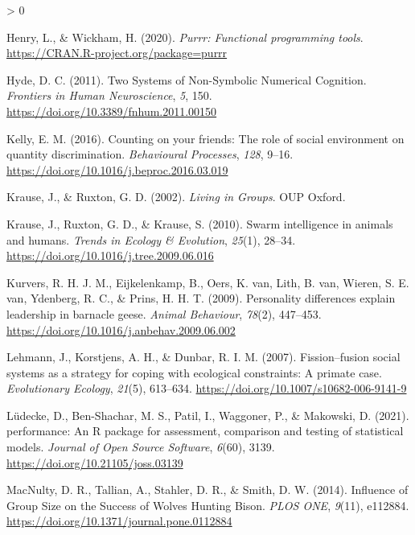 \documentclass[
  english,
  ,doc,floatsintext]{apa6}
\newlength{\cslhangindent}
\newenvironment{CSLReferences}[2] %
 {%
  \setlength{\parindent}{0pt}
  \ifodd #1 \everypar{\setlength{\hangindent}{\cslhangindent}}\ignorespaces\fi
  \ifnum #2 > 0
  \setlength{\parskip}{#2\baselineskip}
  \fi
 }%
 {}
\begin{document}
\begin{CSLReferences}{1}{0}
\leavevmode\hypertarget{ref-R-purrr}{}%
Henry, L., \& Wickham, H. (2020). \emph{Purrr: Functional programming tools}. \url{https://CRAN.R-project.org/package=purrr}

\leavevmode\hypertarget{ref-Hyde.2011}{}%
Hyde, D. C. (2011). Two {Systems} of {Non}-{Symbolic} {Numerical} {Cognition}. \emph{Frontiers in Human Neuroscience}, \emph{5}, 150. \url{https://doi.org/10.3389/fnhum.2011.00150}

\leavevmode\hypertarget{ref-Kelly.2016}{}%
Kelly, E. M. (2016). Counting on your friends: {The} role of social environment on quantity discrimination. \emph{Behavioural Processes}, \emph{128}, 9--16. \url{https://doi.org/10.1016/j.beproc.2016.03.019}

\leavevmode\hypertarget{ref-Krause.Ruxton.2002}{}%
Krause, J., \& Ruxton, G. D. (2002). \emph{Living in {Groups}}. OUP Oxford.

\leavevmode\hypertarget{ref-Krause.etal.2010}{}%
Krause, J., Ruxton, G. D., \& Krause, S. (2010). Swarm intelligence in animals and humans. \emph{Trends in Ecology \& Evolution}, \emph{25}(1), 28--34. \url{https://doi.org/10.1016/j.tree.2009.06.016}

\leavevmode\hypertarget{ref-Kurvers.etal.2009}{}%
Kurvers, R. H. J. M., Eijkelenkamp, B., Oers, K. van, Lith, B. van, Wieren, S. E. van, Ydenberg, R. C., \& Prins, H. H. T. (2009). Personality differences explain leadership in barnacle geese. \emph{Animal Behaviour}, \emph{78}(2), 447--453. \url{https://doi.org/10.1016/j.anbehav.2009.06.002}

\leavevmode\hypertarget{ref-Lehmann.etal.2007}{}%
Lehmann, J., Korstjens, A. H., \& Dunbar, R. I. M. (2007). Fission--fusion social systems as a strategy for coping with ecological constraints: A primate case. \emph{Evolutionary Ecology}, \emph{21}(5), 613--634. \url{https://doi.org/10.1007/s10682-006-9141-9}

\leavevmode\hypertarget{ref-R-performance}{}%
Lüdecke, D., Ben-Shachar, M. S., Patil, I., Waggoner, P., \& Makowski, D. (2021). {performance}: An {R} package for assessment, comparison and testing of statistical models. \emph{Journal of Open Source Software}, \emph{6}(60), 3139. \url{https://doi.org/10.21105/joss.03139}

\leavevmode\hypertarget{ref-MacNulty.etal.2014}{}%
MacNulty, D. R., Tallian, A., Stahler, D. R., \& Smith, D. W. (2014). Influence of {Group} {Size} on the {Success} of {Wolves} {Hunting} {Bison}. \emph{PLOS ONE}, \emph{9}(11), e112884. \url{https://doi.org/10.1371/journal.pone.0112884}


\end{CSLReferences}
\end{document}
